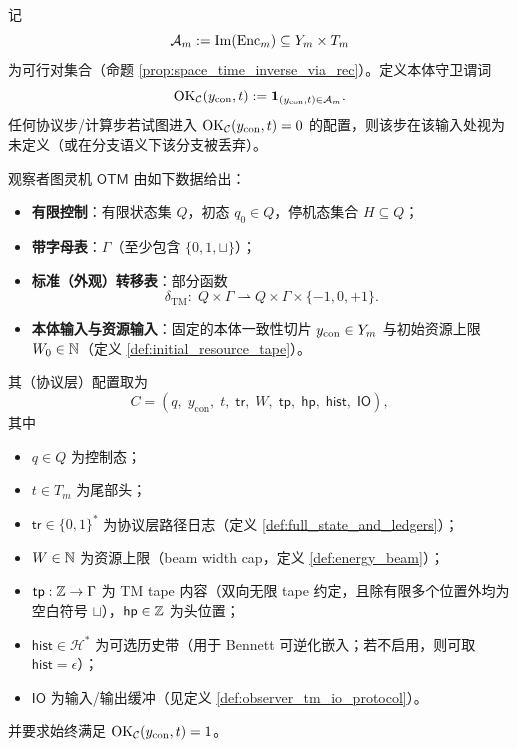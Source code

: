 \begin{definition}\label{def:ok_Clo_guard}
记
$$
\mathcal A_m := \mathrm{Im}(\mathrm{Enc}_m)\subseteq Y_m\times T_m
$$
为可行对集合（命题 \ref{prop:space_time_inverse_via_rec}）。定义本体守卫谓词
$$
\mathrm{OK}_{\mathcal{C}}(y_{\mathrm{con}},t):=\mathbf 1_{(y_{\mathrm{con}},t)\in\mathcal A_m}.
$$
任何协议步/计算步若试图进入 \(\mathrm{OK}_{\mathcal{C}}(y_{\mathrm{con}},t)=0\) 的配置，则该步在该输入处视为未定义（或在分支语义下该分支被丢弃）。
\end{definition}

\begin{definition}\label{def:observer_tm_signature_config}
观察者图灵机 \(\mathsf{OTM}\) 由如下数据给出：
\begin{itemize}
  \item \textbf{有限控制}：有限状态集 \(Q\)，初态 \(q_0\in Q\)，停机态集合 \(H\subseteq Q\)；
  \item \textbf{带字母表}：\(\Gamma\)（至少包含 \(\{0,1,\sqcup\}\)）；
  \item \textbf{标准（外观）转移表}：部分函数
  $$
  \delta_{\mathrm{TM}}:\;Q\times\Gamma\rightharpoonup Q\times\Gamma\times\{-1,0,+1\}.
  $$
  \item \textbf{本体输入与资源输入}：固定的本体一致性切片 \(y_{\mathrm{con}}\in Y_m\) 与初始资源上限 \(W_0\in\mathbb{N}\)（定义 \ref{def:initial_resource_tape}）。
\end{itemize}
其（协议层）配置取为
$$
C=(q,\;y_{\mathrm{con}},\;t,\;\mathsf{tr},\;W,\;\mathsf{tp},\;\mathsf{hp},\;\mathsf{hist},\;\mathsf{IO}),
$$
其中
\begin{itemize}
  \item \(q\in Q\) 为控制态；
  \item \(t\in T_m\) 为尾部头；
  \item \(\mathsf{tr}\in\{0,1\}^\ast\) 为协议层路径日志（定义 \ref{def:full_state_and_ledgers}）；
  \item \(W\in\mathbb{N}\) 为资源上限（beam width cap，定义 \ref{def:energy_beam}）；
  \item \(\mathsf{tp}:\mathbb{Z}\to\Gamma\) 为 TM tape 内容（双向无限 tape 约定，且除有限多个位置外均为空白符号 \(\sqcup\)），\(\mathsf{hp}\in\mathbb{Z}\) 为头位置；
  \item \(\mathsf{hist}\in\mathcal H^\ast\) 为可选历史带（用于 Bennett 可逆化嵌入；若不启用，则可取 \(\mathsf{hist}=\epsilon\)）；
  \item \(\mathsf{IO}\) 为输入/输出缓冲（见定义 \ref{def:observer_tm_io_protocol}）。
\end{itemize}
并要求始终满足 \(\mathrm{OK}_{\mathcal{C}}(y_{\mathrm{con}},t)=1\)。
\end{definition}

